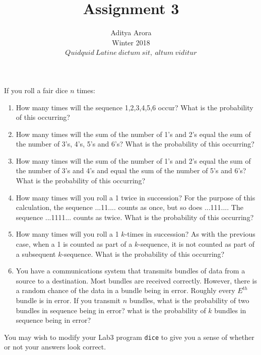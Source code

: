 \documentclass[12pt]{article}
\newenvironment{problem}[2][Problem]{\begin{trivlist}
\item[\hskip \labelsep {\bfseries #1}\hskip \labelsep {\bfseries #2.}]}{\end{trivlist}}
\begin{document}

\title{Assignment 3}%
\author{Aditya Arora\\ %
Winter 2018\\$Quidquid\ Latine\ dictum\ sit,\ altum\ viditur$} %
\maketitle

\begin{problem}{1}
If you roll a fair dice $n$ times:
\begin{enumerate}
    \parskip=0in
    \parsep=0in
    \itemsep=0.1in
    \item How many times will the sequence 1,2,3,4,5,6 occur?  What is the probability of this occurring?
    \item How many times will the sum of the number of 1's and 2's equal the sum of the number of 3's, 4's, 5's and 6's?  What is the probability of this occurring?
    \item How many times will the sum of the number of 1's and 2's equal the sum of the number of 3's and 4's and equal the sum of the number of 5's and 6's?  What is the probability of this occurring?
    \item How many times will you roll a 1 twice in succession?  For the purpose of this calculation, the sequence ...11.... counts as once, but so does ...111....  The sequence ...1111... counts as twice.  What is the probability of this occurring?
    \item How many times will you roll a 1 $k$-times in succession?  As with the previous case, when a 1 is counted as part of a $k$-sequence, it is not counted as part of a subsequent $k$-sequence.  What is the probability of this occurring?
    \item You have a communications system that transmits bundles of data from a source to a destination.  Most bundles are received correctly. However, there is a random chance of the data in a bundle being in error.  Roughly every $E^{th}$ bundle is in error.  If you transmit $n$ bundles, what is the probability of two bundles in sequence being in error?  what is the probability of $k$ bundles in sequence being in error?
\end{enumerate}

You may wish to modify your Lab3 program {\tt dice} to give you a
sense of whether or not your answers look correct.
\end{problem}
\end{document}
